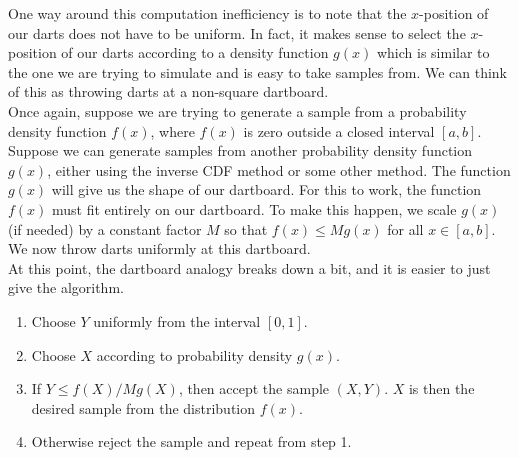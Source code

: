 \documentclass[12pt]{article}
\theoremstyle{definition}
\theoremstyle{remark}
\begin{document}
One way around this computation inefficiency is to note that the $x$-position of our darts does not have to be uniform. In fact, it makes sense to select the $x$-position of our darts according to a density function $g(x)$ which is similar to the one we are trying to simulate and is easy to take samples from. We can think of this as throwing darts at a non-square dartboard. \\

Once again, suppose we are trying to generate a sample from a probability density function $f(x)$, where $f(x)$ is zero outside a closed interval $[a, b]$. Suppose we can generate samples from another probability density function $g(x)$, either using the inverse CDF method or some other method. The function $g(x)$ will give us the shape of our dartboard. For this to work, the function $f(x)$ must fit entirely on our dartboard. To make this happen, we scale $g(x)$ (if needed) by a constant factor $M$ so that $f(x) \leq M g(x)$ for all $x \in [a, b]$. We now throw darts uniformly at this dartboard. \\

At this point, the dartboard analogy breaks down a bit, and it is easier to just give the algorithm.
\begin{enumerate}
\item Choose $Y$ uniformly from the interval $[0,1]$.
\item Choose $X$ according to probability density $g(x)$.
\item If $Y \leq f(X) / M g(X)$, then accept the sample $(X, Y)$. $X$ is then the desired sample from the distribution $f(x)$.
\item Otherwise reject the sample and repeat from step 1.
\end{enumerate}
\end{document}
